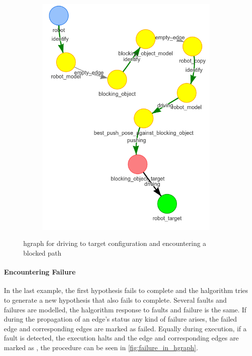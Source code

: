\begin{figure}[H]
\begin{subfigure}{.3\textwidth}
    \caption{}\label{subfig:blocking_obj_5}
    \end{subfigure}
    \begin{subfigure}{.3\textwidth}
    \centering
    \includegraphics[width=\textwidth]{figures/connecting_nodes/blocking_obj/blocking_obj_6}
    \caption{}\label{subfig:blocking_obj_6}
    \end{subfigure}
    \caption{\ac{hgraph} for driving to target configuration and encountering a blocked path}%
    \label{fig:blocking_obj_hgraph}
\end{figure}

\paragraph{Encountering Failure}%
In the last example, the first hypothesis fails to complete and the \ac{halgorithm} tries to generate a new hypothesis that also fails to complete. Several faults and failures are modelled, the \ac{halgorithm} response to faults and failure is the same. If during the propagation of an edge's status any kind of failure arises, the failed edge and corresponding edges are marked as failed. Equally during execution, if a fault is detected, the execution halts and the edge and corresponding edges are marked as , the procedure can be seen in \cref{fig:failure_in_hgraph}.\bs

